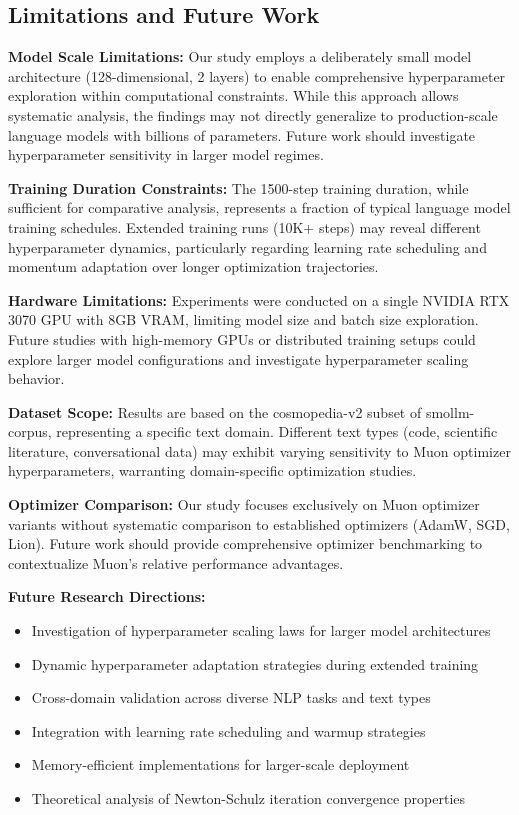 \documentclass[11pt,a4paper]{article}
\begin{document}
\subsection{Limitations and Future Work}

\textbf{Model Scale Limitations:} Our study employs a deliberately small model architecture (128-dimensional, 2 layers) to enable comprehensive hyperparameter exploration within computational constraints. While this approach allows systematic analysis, the findings may not directly generalize to production-scale language models with billions of parameters. Future work should investigate hyperparameter sensitivity in larger model regimes.

\textbf{Training Duration Constraints:} The 1500-step training duration, while sufficient for comparative analysis, represents a fraction of typical language model training schedules. Extended training runs (10K+ steps) may reveal different hyperparameter dynamics, particularly regarding learning rate scheduling and momentum adaptation over longer optimization trajectories.

\textbf{Hardware Limitations:} Experiments were conducted on a single NVIDIA RTX 3070 GPU with 8GB VRAM, limiting model size and batch size exploration. Future studies with high-memory GPUs or distributed training setups could explore larger model configurations and investigate hyperparameter scaling behavior.

\textbf{Dataset Scope:} Results are based on the cosmopedia-v2 subset of smollm-corpus, representing a specific text domain. Different text types (code, scientific literature, conversational data) may exhibit varying sensitivity to Muon optimizer hyperparameters, warranting domain-specific optimization studies.

\textbf{Optimizer Comparison:} Our study focuses exclusively on Muon optimizer variants without systematic comparison to established optimizers (AdamW, SGD, Lion). Future work should provide comprehensive optimizer benchmarking to contextualize Muon's relative performance advantages.

\textbf{Future Research Directions:}
\begin{itemize}
    \item Investigation of hyperparameter scaling laws for larger model architectures
    \item Dynamic hyperparameter adaptation strategies during extended training
    \item Cross-domain validation across diverse NLP tasks and text types
    \item Integration with learning rate scheduling and warmup strategies
    \item Memory-efficient implementations for larger-scale deployment
    \item Theoretical analysis of Newton-Schulz iteration convergence properties
\end{itemize}
\end{document}
